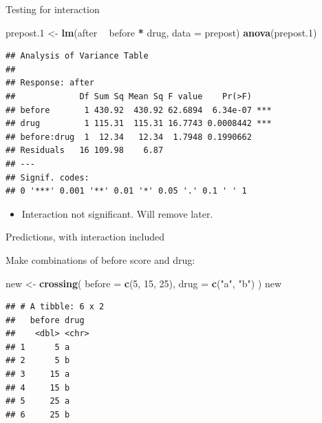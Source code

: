 \documentclass[ignorenonframetext,]{beamer}
\newenvironment{Shaded}{\begin{snugshade}}{\end{snugshade}}
\newcommand{\DataTypeTok}[1]{\textcolor[rgb]{0.13,0.29,0.53}{#1}}
\newcommand{\DecValTok}[1]{\textcolor[rgb]{0.00,0.00,0.81}{#1}}
\newcommand{\FloatTok}[1]{\textcolor[rgb]{0.00,0.00,0.81}{#1}}
\newcommand{\KeywordTok}[1]{\textcolor[rgb]{0.13,0.29,0.53}{\textbf{#1}}}
\newcommand{\NormalTok}[1]{#1}
\newcommand{\OperatorTok}[1]{\textcolor[rgb]{0.81,0.36,0.00}{\textbf{#1}}}
\newcommand{\StringTok}[1]{\textcolor[rgb]{0.31,0.60,0.02}{#1}}
\providecommand{\tightlist}{%
  \setlength{\itemsep}{0pt}\setlength{\parskip}{0pt}}
\begin{document}
\begin{frame}[fragile]{Testing for interaction}
\protect\hypertarget{testing-for-interaction}{}

\begin{Shaded}
\begin{Highlighting}[]
\NormalTok{prepost}\FloatTok{.1}\NormalTok{ <-}\StringTok{ }\KeywordTok{lm}\NormalTok{(after }\OperatorTok{~}\StringTok{ }\NormalTok{before }\OperatorTok{*}\StringTok{ }\NormalTok{drug, }\DataTypeTok{data =}\NormalTok{ prepost)}
\KeywordTok{anova}\NormalTok{(prepost}\FloatTok{.1}\NormalTok{)}
\end{Highlighting}
\end{Shaded}

\begin{verbatim}
## Analysis of Variance Table
## 
## Response: after
##             Df Sum Sq Mean Sq F value    Pr(>F)    
## before       1 430.92  430.92 62.6894  6.34e-07 ***
## drug         1 115.31  115.31 16.7743 0.0008442 ***
## before:drug  1  12.34   12.34  1.7948 0.1990662    
## Residuals   16 109.98    6.87                      
## ---
## Signif. codes:  
## 0 '***' 0.001 '**' 0.01 '*' 0.05 '.' 0.1 ' ' 1
\end{verbatim}

\begin{itemize}
\tightlist
\item
  Interaction not significant. Will remove later.
\end{itemize}

\end{frame}

\begin{frame}[fragile]{Predictions, with interaction included}
\protect\hypertarget{predictions-with-interaction-included}{}

Make combinations of before score and drug:

\begin{Shaded}
\begin{Highlighting}[]
\NormalTok{new <-}\StringTok{ }\KeywordTok{crossing}\NormalTok{(}
  \DataTypeTok{before =} \KeywordTok{c}\NormalTok{(}\DecValTok{5}\NormalTok{, }\DecValTok{15}\NormalTok{, }\DecValTok{25}\NormalTok{),}
  \DataTypeTok{drug =} \KeywordTok{c}\NormalTok{(}\StringTok{"a"}\NormalTok{, }\StringTok{"b"}\NormalTok{)}
\NormalTok{)}
\NormalTok{new}
\end{Highlighting}
\end{Shaded}

\begin{verbatim}
## # A tibble: 6 x 2
##   before drug 
##    <dbl> <chr>
## 1      5 a    
## 2      5 b    
## 3     15 a    
## 4     15 b    
## 5     25 a    
## 6     25 b
\end{verbatim}

\end{frame}
\end{document}
